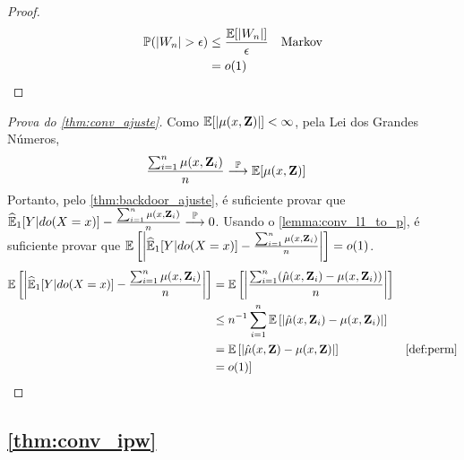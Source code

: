 \begin{proof}
 \begin{align*}
  {\mathbb P}(|W_n| > \epsilon)
  &\leq \frac{{\mathbb E}[|W_n|]}{\epsilon} & \text{Markov} \\
  &= o(1)
 \end{align*}
\end{proof}

\begin{proof}[Prova do \cref{thm:conv_ajuste}]
 Como ${\mathbb E}[|\mu(x,{\mathbf{Z}})|] < \infty$,
 pela Lei dos Grandes Números,
 \begin{align*}
  \frac{\sum_{i=1}^n \mu(x,{\mathbf{Z}}_i)}{n}
  &\stackrel{{\mathbb P}}{\longrightarrow} {\mathbb E}[\mu(x,{\mathbf{Z}})]
 \end{align*}
 Portanto, pelo \cref{thm:backdoor_ajuste},
 é suficiente provar que
 ${\widehat{{\mathbb E}}}_{1}[Y|do(X=x)] - \frac{\sum_{i=1}^n \mu(x,{\mathbf{Z}}_i)}{n} \stackrel{{\mathbb P}}{\longrightarrow} 0$.
 Usando o \cref{lemma:conv_l1_to_p}, é suficiente provar que 
 ${\mathbb E}\left[\bigg|{\widehat{{\mathbb E}}}_{1}[Y|do(X=x)] - \frac{\sum_{i=1}^n \mu(x,{\mathbf{Z}}_i)}{n}\bigg|\right] 
 = o(1)$.
 \begin{align*}
  \E\left[\bigg|\hdoy - \frac{\sum_{i=1}^n \mu(x,\Z_i)}{n}\bigg|\right]
  &= \E\left[\bigg|\frac{\sum_{i=1}^n 
  (\hat{\mu}(x,\Z_i)-\mu(x,\Z_i))}{n}\bigg|\right] \\
  &\leq n^{-1}\sum_{i=1}^n \E\left[| 
  \hat{\mu}(x,\Z_i)-\mu(x,\Z_i)|\right] \\
  &= \E\left[|\hat{\mu}(x,\Z)-\mu(x,\Z)|\right] 
  & \text{\cref{def:perm}} \\
  &= o(1)]
 \end{align*}
\end{proof}

\subsection{\cref{thm:conv_ipw}}


